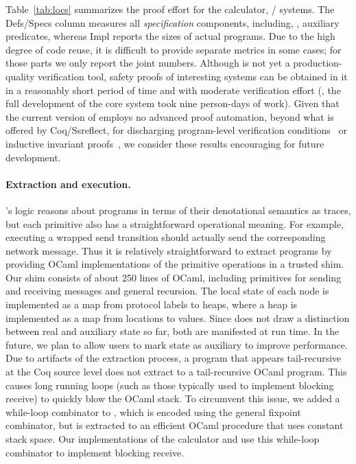%
Table~\ref{tab:locs}  summarizes the proof effort for the calculator,
/ systems.
%
The \textsf{Defs/Specs} column measures all \emph{specification}
components, including, \eg, auxiliary predicates, whereas
\textsf{Impl} reports the sizes of actual \disel programs.
%
Due to the high degree of code reuse, it is difficult to provide
separate metrics in some cases; for those parts we only report the
joint numbers.
%
Although \disel is not yet a production-quality verification tool,
safety proofs of interesting systems can be obtained in it in a
reasonably short period of time and with moderate verification effort
(\eg, the full development of the core  system took nine
person-days of work).
%
Given that the current version of \disel employs no advanced proof
automation, beyond what is offered by Coq/Ssreflect, for discharging
program-level verification conditions~\cite{chlipala:bedrock} or
inductive invariant proofs~\cite{Padon-al:PLDI16}, we consider these
results encouraging for future development.

\paragraph{Extraction and execution.~}
\label{sec:extracting-runtime}

\disel's logic reasons about programs in terms of their denotational
semantics as traces, but each primitive also has a
straightforward operational meaning.
%
For example, executing a wrapped send transition should actually send
the corresponding network message.
%
Thus it is relatively straightforward to extract \disel programs by
providing OCaml implementations of the primitive operations in a
trusted shim.
%
Our shim consists of about 250 lines of OCaml, including primitives
for sending and receiving messages and general recursion.
%
The local state of each node is implemented as a map from protocol
labels to heaps, where a heap is implemented as a map from locations
to values.
%
Since \disel does not draw a distinction between real and auxiliary
state so far, both are manifested at run time.
%
In the future, we plan to allow users to mark state as auxiliary to
improve performance.
%
Due to artifacts of the extraction process, a \disel program that
appears tail-recursive at the Coq source level does not extract to a
tail-recursive OCaml program.
%
This causes long running loops (such as those typically used to
implement blocking receive) to quickly blow the OCaml stack.
%
To circumvent this issue, we added a while-loop combinator to \disel,
which is encoded using the general fixpoint combinator, but is extracted to
an efficient OCaml procedure that uses constant stack space.
%
Our implementations of the calculator and  use this
while-loop combinator to implement blocking receive.
%

